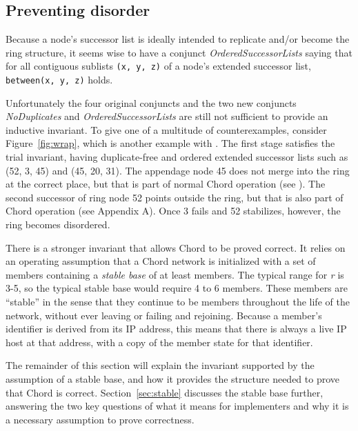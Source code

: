 \documentclass[conference]{IEEEtran}
\begin{document}
\subsection{Preventing disorder}
\label{sec:disorder}

Because a node's successor list is ideally intended to replicate
and/or become the ring structure, it seems wise to have
a conjunct
{\it OrderedSuccessorLists} saying that
for all contiguous sublists
\small
{\tt (x, y, z)}
\normalsize
of
a node's extended successor list,
\small
{\tt between(x, y, z)}
\normalsize
holds.

Unfortunately the four original conjuncts and the two new conjuncts
{\it NoDuplicates} and {\it OrderedSuccessorLists}
are still not
sufficient to provide an inductive invariant.
To give one of a multitude of counterexamples, consider
Figure~\ref{fig:wrap}, which is another example with .
The first stage satisfies the trial invariant, having duplicate-free
and ordered extended
successor lists such as (52, 3, 45) and (45, 20, 31).
The appendage node 45 does not merge into the ring at the correct
place, but that is part of normal Chord operation (see \cite{chord-ccr}).
The second successor of ring node 52 points outside the ring, but
that is also part of Chord operation (see Appendix A).
Once 3 fails and 52 stabilizes, however, 
the ring becomes disordered.

There is a stronger invariant that allows Chord to be proved correct.
It relies on an operating assumption that a Chord network is initialized
with a set of members containing a {\it stable base} of at least 
members.
The typical range for {\it r} is 3-5, so the typical stable base would
require 4 to 6 members.
These members are ``stable'' in the sense that they continue to be
members throughout the life of the network, without ever leaving or
failing and rejoining.
Because a member's identifier is derived from its IP address, this
means that there is always a live IP host at that address, with
a copy of the member state for that identifier.

The remainder of this section will explain the invariant supported
by the assumption of a stable base, and how it provides the structure
needed to prove that Chord is correct.
Section~\ref{sec:stable} discusses the stable base further, answering
the two key questions of what it means for implementers and why it
is a necessary assumption to prove correctness.
\end{document}
